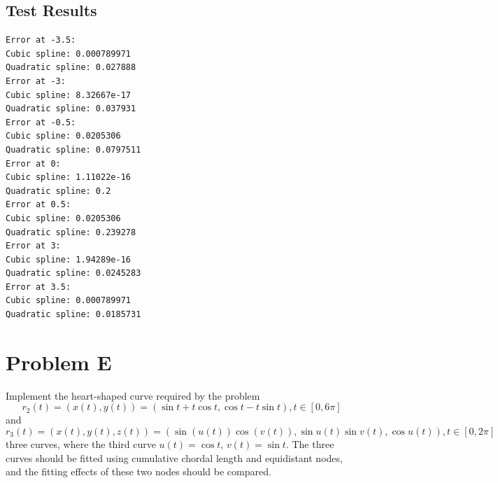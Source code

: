 \documentclass[a4paper]{article}
\begin{document}
\subsection{Test Results}

\begin{verbatim}
Error at -3.5:
Cubic spline: 0.000789971
Quadratic spline: 0.027888
Error at -3:
Cubic spline: 8.32667e-17
Quadratic spline: 0.037931
Error at -0.5:
Cubic spline: 0.0205306
Quadratic spline: 0.0797511
Error at 0:
Cubic spline: 1.11022e-16
Quadratic spline: 0.2
Error at 0.5:
Cubic spline: 0.0205306
Quadratic spline: 0.239278
Error at 3:
Cubic spline: 1.94289e-16
Quadratic spline: 0.0245283
Error at 3.5:
Cubic spline: 0.000789971
Quadratic spline: 0.0185731
\end{verbatim}

\section{Problem E}

Implement the heart-shaped curve required by the problem \[ r_2(t) = (x(t), y(t)) = (\sin t + t \cos t, \cos t - t \sin t), t \in [0, 6\pi] \] and \[ r_3(t) = (x(t), y(t), z(t)) = (\sin(u(t)) \cos(v(t)), \sin u(t) \sin v(t), \cos u(t)), t \in [0, 2\pi] \] three curves, where the third curve \( u(t) = \cos t \), \( v(t) = \sin t \). The three curves should be fitted using cumulative chordal length and equidistant nodes, and the fitting effects of these two nodes should be compared.
\end{document}
